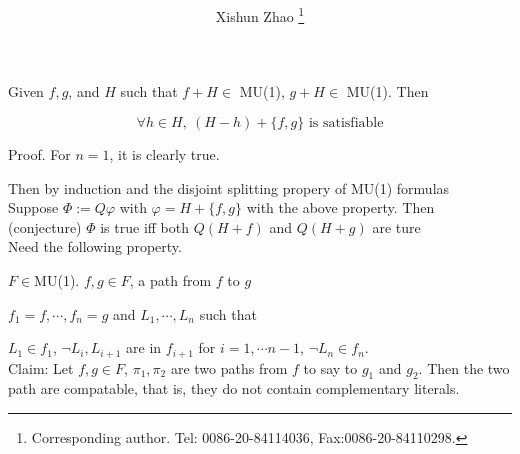\documentclass[12pt]{article}
\begin{document}
\begin{CJK*}{GBK}{song}
\CJKtilde




\title{
}

\author{
Xishun Zhao \footnote{Corresponding author. Tel: 0086-20-84114036,
Fax:0086-20-84110298.}
}


\maketitle

\begin{abstract}

\end{abstract}

Given $f, g$, and $H$ such that $f+H\in$ MU(1), $g+H\in$ MU(1). Then 

$$\forall h\in H, \ (H-h)+\{f,g\} \text{ is satisfiable}$$

Proof. For $n=1$, it is clearly true. 

Then by induction and the disjoint splitting propery of MU(1) formulas \\



Suppose $\Phi:=Q\varphi$ with $\varphi=H+\{f,g\}$ with the above property.
Then (conjecture)
%
$\Phi$ is true iff both $Q(H+f)$ and $Q(H+g)$ are ture\\


Need the following property. 

$F\in $MU(1). $f, g \in F$, a path from $f$ to $g$ 

$f_1=f, \cdots, f_n=g$ and $L_1, \cdots, L_n$ such that 

$L_1\in f_1$, $\neg L_i, L_{i+1}$ are in $f_{i+1}$ for $i=1, \cdots n-1$, $\neg L_n \in f_n$. \\


Claim: Let $f,g\in F$, $\pi_1, \pi_2$ are two paths from $f$ to say to $g_1$ and $g_2$. Then the two path are compatable, that is, they do not contain complementary literals. 


\end{CJK*}
\end{document}
